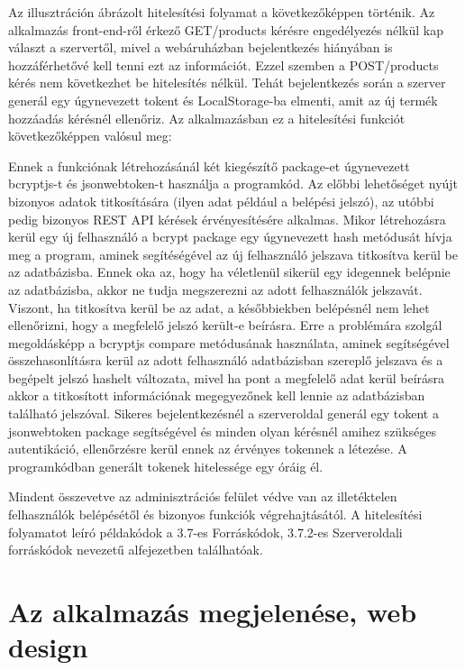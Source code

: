 Az illusztráción ábrázolt hitelesítési folyamat a következőképpen történik. Az alkalmazás front-end-ről érkező GET/products kérésre engedélyezés nélkül kap választ a szervertől, mivel a webáruházban bejelentkezés hiányában is hozzáférhetővé kell tenni ezt az információt. Ezzel szemben a POST/products kérés nem következhet be hitelesítés nélkül. Tehát bejelentkezés során a szerver generál egy úgynevezett tokent és LocalStorage-ba elmenti, amit az új termék hozzáadás kérésnél ellenőriz. Az alkalmazásban ez a hitelesítési funkciót következőképpen valósul meg:

Ennek a funkciónak létrehozásánál két kiegészítő package-et úgynevezett bcryptjs-t és jsonwebtoken-t használja a programkód. Az előbbi lehetőséget nyújt bizonyos adatok titkosítására (ilyen adat például a belépési jelszó), az utóbbi pedig bizonyos REST API kérések érvényesítésére alkalmas. Mikor létrehozásra kerül egy új felhasználó a bcrypt package egy úgynevezett hash metódusát hívja meg a program, aminek segítéségével az új felhasználó jelszava titkosítva kerül be az adatbázisba. Ennek oka az, hogy ha véletlenül sikerül egy idegennek belépnie az adatbázisba, akkor ne tudja megszerezni az adott felhasználók jelszavát. Viszont, ha titkosítva kerül be az adat, a későbbiekben belépésnél nem lehet ellenőrizni, hogy a megfelelő jelszó került-e beírásra. Erre a problémára szolgál megoldásképp a bcryptjs compare metódusának használata, aminek segítségével összehasonlításra kerül az adott felhasználó adatbázisban szereplő jelszava és a begépelt jelszó hashelt változata, mivel ha pont a megfelelő adat kerül beírásra akkor a titkosított információnak megegyezőnek kell lennie az adatbázisban található jelszóval. Sikeres bejelentkezésnél a szerveroldal generál egy tokent a jsonwebtoken package segítségével és minden olyan kérésnél amihez szükséges autentikáció, ellenőrzésre kerül ennek az érvényes tokennek a létezése. A programkódban generált tokenek hitelessége egy óráig él.

\bigskip
Mindent összevetve az adminisztrációs felület védve van az illetéktelen felhasználók belépésétől és bizonyos funkciók végrehajtásától. A hitelesítési folyamatot leíró példakódok a 3.7-es Forráskódok, 3.7.2-es Szerveroldali forráskódok nevezetű alfejezetben találhatóak.


\section{Az alkalmazás megjelenése, web design} %


